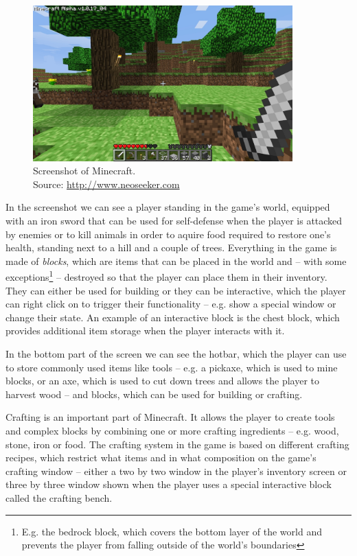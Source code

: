 \begin{figure}[h]
    \centering
    \includegraphics[width=10cm]{../img/minecraft.jpg}
    \caption{Screenshot of Minecraft.
             \\Source: \href{http://i.neoseeker.com/p/Games/PC/Simulation/City/minecraft\_image\_zx2AU2n6bZho0lz.jpg}{http://www.neoseeker.com}}
    \label{minecraft}
\end{figure}

In the screenshot we can see a player standing in the game's world, equipped with an iron sword that can be used for self-defense when the
player is attacked by enemies or to kill animals in order to aquire food required to restore one's health, standing next to a hill and
a couple of trees. Everything in the game is made of \emph{blocks}, which are items that can be placed in the world and
-- with some exceptions\footnote{E.g. the bedrock block, which covers
the bottom layer of the world and prevents the player from falling outside of the world's boundaries} -- destroyed so that the player
can place them in their inventory. They can either be used for building or they can be interactive, which the player can right click on
to trigger their functionality -- e.g. show a special window or change their state. An example of an interactive block is the chest block,
which provides additional item storage when the player interacts with it.

In the bottom part of the screen we can see the hotbar, which the player can use to store commonly used items 
like tools -- e.g. a pickaxe, which is used to mine blocks,
or an axe, which is used to cut down trees and allows the player to harvest wood -- and blocks, which can be used for building or
crafting.

Crafting is an important part of Minecraft. It allows the player to create tools and complex blocks by combining one or more crafting
ingredients -- e.g. wood, stone, iron or food. The crafting system in the game is based on different crafting recipes, which restrict
what items and in what composition on the game's crafting window -- either a two by two window in the player's inventory screen
or three by three window shown when the player uses a special interactive block called the crafting bench.

